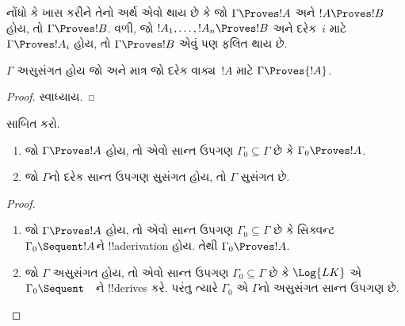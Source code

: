\documentclass[../../../include/open-logic-section]{subfiles}
\begin{document}
નોંધો કે ખાસ કરીને તેનો અર્થ એવો
થાય છે કે જો $\Gamma \Proves !A$
અને $!A \Proves !B$ હોય, તો
$\Gamma \Proves !B$. વળી, જો
$!A_1, \dots, !A_n \Proves !B$
અને દરેક~$i$ માટે
$\Gamma \Proves !A_i$ હોય,
તો $\Gamma \Proves !B$
એવું પણ ફલિત થાય છે.

\begin{prop}
$\Gamma$ અસુસંગત હોય જો અને
માત્ર જો દરેક વાક્ય~$!A$ માટે
$\Gamma \Proves {!A}$.
\end{prop}

\begin{proof}
સ્વાધ્યાય.
\end{proof}

\begin{prob}
 સાબિત કરો.

\end{prob}

\begin{prop}[સઘનતા]
  \begin{enumerate}
  \item જો $\Gamma \Proves !A$ હોય, તો
    એવો સાન્ત ઉપગણ $\Gamma_0
    \subseteq \Gamma$ છે કે
    $\Gamma_0 \Proves !A$.
  \item જો $\Gamma$નો દરેક
    સાન્ત ઉપગણ સુસંગત હોય,
    તો $\Gamma$ સુસંગત છે.
  \end{enumerate}
\end{prop}

\begin{proof}
  \begin{enumerate}
    \item જો $\Gamma \Proves !A$ હોય,
      તો એવો સાન્ત ઉપગણ
      $\Gamma_0 \subseteq \Gamma$ છે કે
      સિક્વન્ટ $\Gamma_0
      \Sequent !A$ને
      !!a{derivation} હોય. તેથી
      $\Gamma_0 \Proves !A$.
    \item જો $\Gamma$ અસુસંગત હોય,
      તો એવો સાન્ત ઉપગણ
      $\Gamma_0 \subseteq \Gamma$ છે કે
      $\Log{LK}$ એ $\Gamma_0
      \Sequent \quad$ને
      !!{derive}s કરે. પરંતુ
      ત્યારે $\Gamma_0$ એ
      $\Gamma$નો અસુસંગત
      સાન્ત ઉપગણ છે.
  \end{enumerate}
\end{proof}
\end{document}

